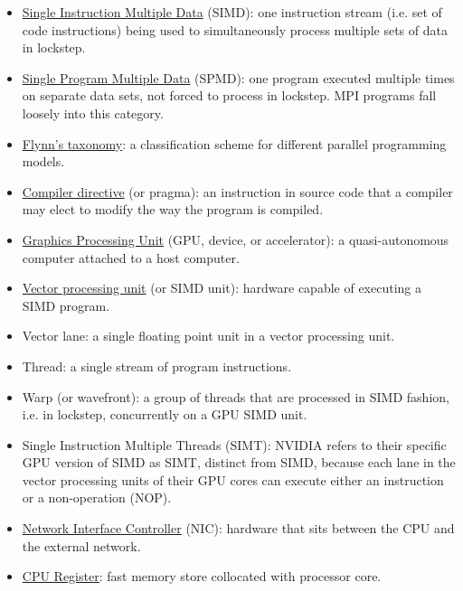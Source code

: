 \begin{itemize}
    \item \href{https://en.wikipedia.org/wiki/SIMD}{Single Instruction Multiple Data} (SIMD): one instruction stream (i.e. set of code instructions) being used to simultaneously process multiple sets of data in lockstep.
    \item \href{https://en.wikipedia.org/wiki/SPMD}{Single Program Multiple Data} (SPMD): one program executed multiple times on separate data sets, not forced to process in lockstep. MPI programs fall loosely into this category.
    \item \href{https://en.wikipedia.org/wiki/Flynn's_taxonomy}{Flynn's taxonomy}: a classification scheme for different parallel programming models.
    \item \href{https://en.wikipedia.org/wiki/Directive_(programming)}{Compiler directive} (or pragma): an instruction in source code that a compiler may elect to modify the way the program is compiled.
    \item \href{https://en.wikipedia.org/wiki/Graphics_processing_unit}{Graphics Processing Unit} (GPU, device, or accelerator): a quasi-autonomous computer attached to a host computer. 
    \item \href{https://en.wikipedia.org/wiki/Vector_processor}{Vector processing unit} (or SIMD unit): hardware capable of executing a SIMD program. 
    \item Vector lane: a single floating point unit in a vector processing unit.
    \item Thread: a single stream of program instructions.
    \item Warp (or wavefront): a group of threads that are processed in SIMD fashion, i.e. in lockstep, concurrently on a GPU SIMD unit. 
    \item Single Instruction Multiple Threads (SIMT): NVIDIA  refers to their specific GPU version of SIMD as SIMT, distinct from SIMD, because each lane in the vector processing units of their GPU cores  can execute either an instruction or a non-operation (NOP).
    \item \href{https://en.wikipedia.org/wiki/Network_interface_controller}{Network Interface Controller} (NIC): hardware that sits between the CPU and the external network. 
    \item \href{https://en.wikipedia.org/wiki/Processor_register}{CPU Register}: fast memory store collocated with processor core.
    
\end{itemize}